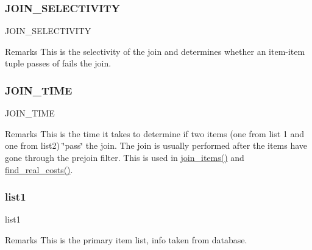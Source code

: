 \subsubsection{\texorpdfstring{JOIN\_SELECTIVITY}{JOIN\_SELECTIVITY}}
{\footnotesize\ttfamily J\+O\+I\+N\+\_\+\+S\+E\+L\+E\+C\+T\+I\+V\+I\+TY}

\begin{DoxyRemark}{Remarks}
This is the selectivity of the join and determines whether an item-\/item tuple passes of fails the join. 
\end{DoxyRemark}
\mbox{\label{classdynamicfilterapp_1_1models_1_1_join_a2c37c419033162e3fc2632987e65647e}} 
\subsubsection{\texorpdfstring{JOIN\_TIME}{JOIN\_TIME}}
{\footnotesize\ttfamily J\+O\+I\+N\+\_\+\+T\+I\+ME}

\begin{DoxyRemark}{Remarks}
This is the time it takes to determine if two items (one from list 1 and one from list2) \char`\"{}pass\char`\"{} the join. The join is usually performed after the items have gone through the prejoin filter. This is used in \mbox{\hyperlink{classdynamicfilterapp_1_1models_1_1_join_af917b6ab7796d7f1e90cb6a45b164120}{join\+\_\+items()}} and \mbox{\hyperlink{classdynamicfilterapp_1_1models_1_1_join_adb5d30a19bc96815ec8f79b9ddefb1cf}{find\+\_\+real\+\_\+costs()}}. 
\end{DoxyRemark}
\mbox{\label{classdynamicfilterapp_1_1models_1_1_join_a6a3026f5b982e8d120fcdf1263775a9f}} 
\subsubsection{\texorpdfstring{list1}{list1}}
{\footnotesize\ttfamily list1}

\begin{DoxyRemark}{Remarks}
This is the primary item list, info taken from database. 
\end{DoxyRemark}
\mbox{\label{classdynamicfilterapp_1_1models_1_1_join_a50a79ea070b020da6dab2bce1e31da3f}} 
